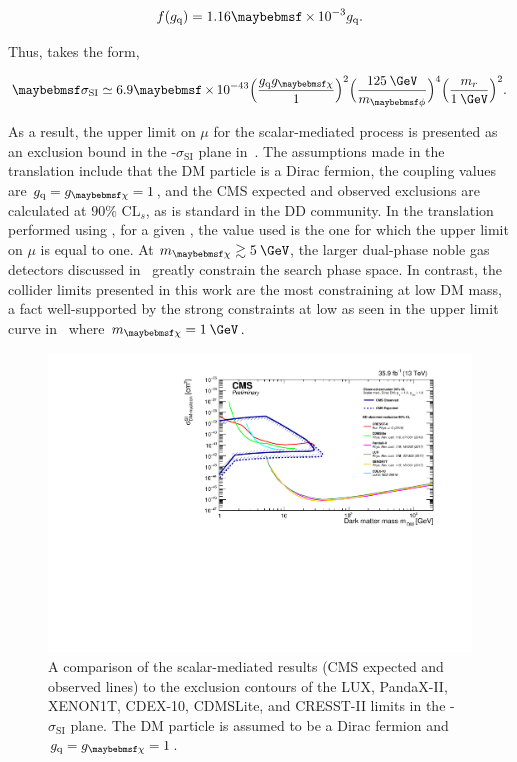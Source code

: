 \begin{equation}
  f(\gq) = 1.16 \times 10^{-3} \gq.
\end{equation} 

Thus, takes the form,

\begin{equation}
  \sigma_{\textrm{SI}} \simeq 6.9 \times 10^{-43} \Big(\frac{\gq\gDM}{1}\Big)^{2}\Big(\frac{125\:\GeV}{\mMed}\Big)^{4}\Big(\frac{m_{r}}{1\:\GeV}\Big)^{2}.
  \label{eq:xsecDDtrans}
\end{equation}

As a result, the upper limit on $\mu$ for the scalar-mediated \ttllDM process is presented as an exclusion bound in the \mDM-$\sigma_{\textrm{SI}}$ plane in~. The assumptions made in the translation include that the DM particle is a Dirac fermion, the coupling values are $\gq = \gDM = 1$, and the CMS expected and observed exclusions are calculated at $90\%$ $\textrm{CL}_{s}$, as is standard in the DD community. In the translation performed using , for a given \mDM, the \mMed value used is the one for which the upper limit on $\mu$ is equal to one. At $\mDM \gtrsim 5\:\GeV$, the larger dual-phase noble gas detectors discussed in~ greatly constrain the search phase space. In contrast, the collider limits presented in this work are the most constraining at low DM mass, a fact well-supported by the strong constraints at low \mMed as seen in the upper limit curve in~ where $\mDM=1\:\GeV$. 

\begin{figure}
  \centering
  \includegraphics[width=\textwidth]{figs/SIS_CMSDD_Summary.pdf}
  \caption{A comparison of the \ttllDM scalar-mediated results (CMS expected and observed lines) to the exclusion contours of the LUX, PandaX-II, XENON1T, CDEX-10, CDMSLite, and CRESST-II limits in the \mDM-$\sigma_{\textrm{SI}}$ plane. The DM particle is assumed to be a Dirac fermion and $\gq = \gDM =1$.}
  \label{fig:DDplot}
\end{figure}
